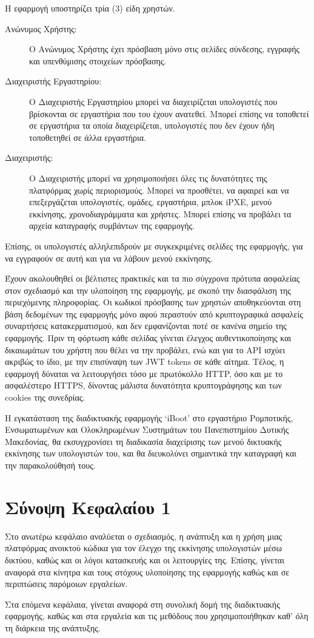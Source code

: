 Η εφαρμογή υποστηρίζει τρία (3) είδη χρηστών.
\begin{description}
	\item [Ανώνυμος Χρήστης:] Ο Ανώνυμος Χρήστης έχει πρόσβαση μόνο στις σελίδες σύνδεσης, εγγραφής και υπενθύμισης στοιχείων πρόσβασης.
	\item [Διαχειριστής Εργαστηρίου:] Ο Διαχειριστής Εργαστηρίου μπορεί να διαχειρίζεται υπολογιστές που βρίσκονται σε εργαστήρια που του έχουν ανατεθεί. Μπορεί επίσης να τοποθετεί σε εργαστήρια τα οποία διαχειρίζεται, υπολογιστές που δεν έχουν ήδη τοποθετηθεί σε άλλα εργαστήρια.
	\item [Διαχειριστής:] Ο Διαχειριστής μπορεί να χρησιμοποιήσει όλες τις δυνατότητες της πλατφόρμας χωρίς περιορισμούς. Μπορεί να προσθέτει, να αφαιρεί και να επεξεργάζεται υπολογιστές, ομάδες, εργαστήρια, μπλοκ iPXE, μενού εκκίνησης, χρονοδιαγράμματα και χρήστες. Μπορεί επίσης να προβάλει τα αρχεία καταγραφής συμβάντων της εφαρμογής.
\end{description}
Επίσης, οι υπολογιστές αλληλεπιδρούν με συγκεκριμένες σελίδες της εφαρμογής, για να εγγραφούν σε αυτή και για να λάβουν μενού εκκίνησης.

Έχουν ακολουθηθεί οι βέλτιστες πρακτικές και τα πιο σύγχρονα πρότυπα ασφαλείας στον σχεδιασμό και την υλοποίηση της εφαρμογής, με σκοπό την διασφάλιση της περιεχόμενης πληροφορίας. Οι κωδικοί πρόσβασης των χρηστών αποθηκεύονται στη βάση δεδομένων της εφαρμογής μόνο αφού περαστούν από κρυπτογραφικά ασφαλείς συναρτήσεις κατακερματισμού, και δεν εμφανίζονται ποτέ σε κανένα σημείο της εφαρμογής. Πριν τη φόρτωση κάθε σελίδας γίνεται έλεγχος αυθεντικοποίησης και δικαιωμάτων του χρήστη που θέλει να την προβάλει, ενώ και για το API ισχύει ακριβώς το ίδιο, με την επισύναψη των JWT tokens σε κάθε αίτημα. Τέλος, η εφαρμογή δύναται να λειτουργήσει τόσο με πρωτόκολλο HTTP, όσο και με το ασφαλέστερο HTTPS, δίνοντας μάλιστα δυνατότητα κρυπτογράφησης και των cookies της συνεδρίας.

Η εγκατάσταση της διαδικτυακής εφαρμογής `iBoot' στο εργαστήριο Ρομποτικής, Ενσωματωμένων και Ολοκληρωμένων Συστημάτων του Πανεπιστημίου Δυτικής Μακεδονίας, θα εκσυγχρονίσει τη διαδικασία διαχείρισης των μενού δικτυακής εκκίνησης των υπολογιστών του, και θα διευκολύνει σημαντικά την καταγραφή και την παρακολούθησή τους.

\section{Σύνοψη Κεφαλαίου 1}
Στο ανωτέρω κεφάλαιο αναλύεται ο σχεδιασμός, η ανάπτυξη και η χρήση μιας πλατφόρμας ανοικτού κώδικα για τον έλεγχο της εκκίνησης υπολογιστών μέσω δικτύου, καθώς και οι λόγοι κατασκευής και οι λειτουργίες της. Επίσης, γίνεται αναφορά στα κίνητρα και τους στόχους υλοποίησης της εφαρμογής καθώς και σε περιπτώσεις παρόμοιων εργαλείων.

Στα επόμενα κεφάλαια, γίνεται αναφορά στη συνολική δομή της διαδικτυακής εφαρμογής, καθώς και στα εργαλεία και τις μεθόδους που χρησιμοποιήθηκαν καθ' όλη τη διάρκεια της ανάπτυξης.
